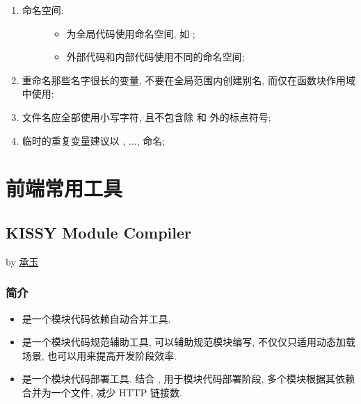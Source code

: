 \documentclass[letterpaper,10pt,english]{sphinxmanual}
\begin{document}
\begin{enumerate}
\item {} \begin{description}
\item[{命名空间:}] \leavevmode\begin{itemize}
\item {}
为全局代码使用命名空间, 如 ;

\item {}
外部代码和内部代码使用不同的命名空间;

\end{itemize}

\end{description}

\item {}
重命名那些名字很长的变量, 不要在全局范围内创建别名, 而仅在函数块作用域中使用;

\item {}
文件名应全部使用小写字符, 且不包含除 \code{-} 和 \code{\_} 外的标点符号;

\item {}
临时的重复变量建议以 , ..., 命名;

\end{enumerate}


\chapter{前端常用工具}
\label{tools/index:tools}\label{tools/index::doc}\label{tools/index:id1}\label{tools/module-compiler/index:module-module-compiler}

\section{KISSY Module Compiler}
\label{tools/module-compiler/index:kissy-module-compiler}\label{tools/module-compiler/index::doc}
by \href{mailto:yiminghe@gmail.com}{承玉}


\subsection{简介}
\label{tools/module-compiler/intro::doc}\label{tools/module-compiler/intro:id1}\begin{itemize}
\item {}
是一个模块代码依赖自动合并工具.

\item {}
是一个模块代码规范辅助工具, 可以辅助规范模块编写, 不仅仅只适用动态加载场景, 也可以用来提高开发阶段效率.

\item {}
是一个模块代码部署工具. 结合 {\hyperref[api/seed/loader/index:module-Loader]{}} , 用于模块代码部署阶段, 多个模块根据其依赖合并为一个文件, 减少 HTTP 链接数.

\end{itemize}
\end{document}
